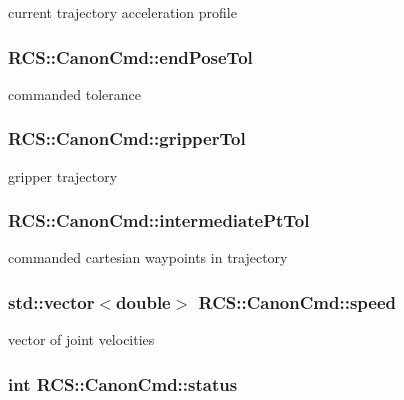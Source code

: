 current trajectory acceleration profile \hypertarget{structRCS_1_1CanonCmd_a8e2cd1a2125319bace4dcdffa20dcb57}{
\subsubsection[{end\-Pose\-Tol}]{ R\-C\-S\-::\-Canon\-Cmd\-::end\-Pose\-Tol}}\label{structRCS_1_1CanonCmd_a8e2cd1a2125319bace4dcdffa20dcb57}
commanded tolerance \hypertarget{structRCS_1_1CanonCmd_a73bc88d51aec0ff12feb4bc2fd12e3e3}{
\subsubsection[{gripper\-Tol}]{ R\-C\-S\-::\-Canon\-Cmd\-::gripper\-Tol}}\label{structRCS_1_1CanonCmd_a73bc88d51aec0ff12feb4bc2fd12e3e3}
gripper trajectory \hypertarget{structRCS_1_1CanonCmd_a48ee6631fb410cf376323c68ffe88258}{
\subsubsection[{intermediate\-Pt\-Tol}]{ R\-C\-S\-::\-Canon\-Cmd\-::intermediate\-Pt\-Tol}}\label{structRCS_1_1CanonCmd_a48ee6631fb410cf376323c68ffe88258}
commanded cartesian waypoints in trajectory \hypertarget{structRCS_1_1CanonCmd_aa31954bd04399469490123786ee17496}{
\subsubsection[{speed}]{\setlength{\rightskip}{0pt plus 5cm}std\-::vector$<$double$>$ R\-C\-S\-::\-Canon\-Cmd\-::speed}}\label{structRCS_1_1CanonCmd_aa31954bd04399469490123786ee17496}
vector of joint velocities \hypertarget{structRCS_1_1CanonCmd_a34ab7b913648967eac1534597830567b}{
\subsubsection[{status}]{\setlength{\rightskip}{0pt plus 5cm}int R\-C\-S\-::\-Canon\-Cmd\-::status}}\label{structRCS_1_1CanonCmd_a34ab7b913648967eac1534597830567b}
